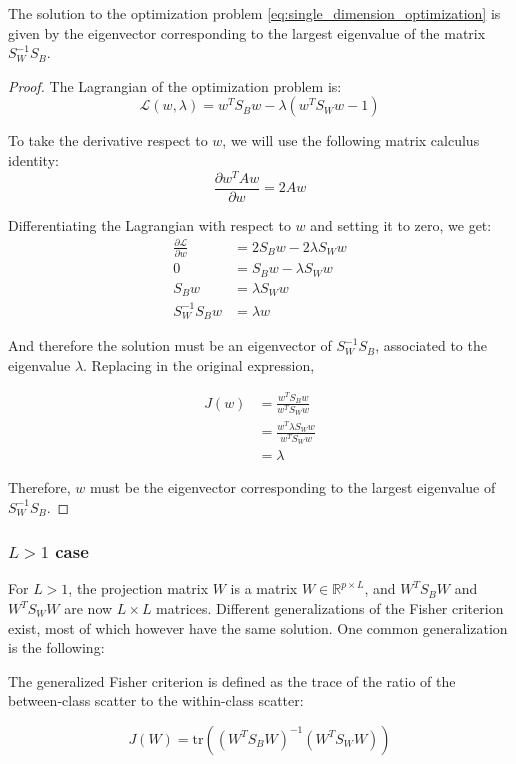 \begin{theorem}
The solution to the optimization problem \ref{eq:single_dimension_optimization} is given by the eigenvector corresponding to the largest eigenvalue of the matrix $S_W^{-1} S_B$.
\end{theorem}

\begin{proof}
The Lagrangian of the optimization problem is:
\[
\mathcal{L}(w, \lambda) = w^T S_B w - \lambda(w^T S_W w - 1)
\]

To take the derivative respect to $w$, we will use the following matrix calculus identity:
\[
\frac{\partial w^T A w}{\partial w} = 2Aw
\]

Differentiating the Lagrangian with respect to $w$ and setting it to zero, we get:
\begin{align*}
\frac{\partial \mathcal{L}}{\partial w} &= 2S_B w - 2\lambda S_W w \\
0 &= S_B w - \lambda S_W w \\
S_B w &= \lambda S_W w \\
S_W^{-1} S_B w &= \lambda w
\end{align*}

And therefore the solution must be an eigenvector of $S_W^{-1} S_B$, associated to the eigenvalue $\lambda$. Replacing in the original expression,

\begin{align*}
J(w) &= \frac{w^T S_B w}{w^T S_W w} \\
&= \frac{w^T \lambda S_W w}{w^T S_W w} \\
& = \lambda
\end{align*}

Therefore, $w$ must be the eigenvector corresponding to the largest eigenvalue of $S_W^{-1} S_B$.

\end{proof}

\subsubsection{$L>1$ case}
For $L>1$, the projection matrix $W$ is a matrix $W \in \mathbb{R}^{p \times L}$, and $W^T S_B W$ and $W^T S_W W$ are now $L \times L$ matrices. Different generalizations of the Fisher criterion exist, most of which however have the same solution. One common generalization is the following:

\begin{definition}
The generalized Fisher criterion is defined as the trace of the ratio of the between-class scatter to the within-class scatter:

\[
J(W) = \text{tr}((W^T S_B W)^{-1} (W^T S_W W))
\]
\end{definition}

